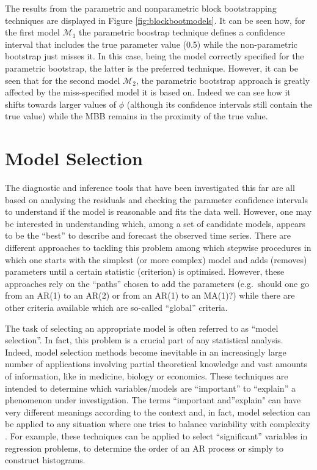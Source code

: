 \documentclass[]{book}
\theoremstyle{definition}
\theoremstyle{definition}
\theoremstyle{definition}
\theoremstyle{remark}
\begin{document}
The results from the parametric and nonparametric block bootstrapping
techniques are displayed in Figure \ref{fig:blockbootmodels}. It can be
seen how, for the first model \(\mathcal{M}_1\) the parametric boostrap
technique defines a confidence interval that includes the true parameter
value (0.5) while the non-parametric bootstrap just misses it. In this
case, being the model correctly specified for the parametric bootstrap,
the latter is the preferred technique. However, it can be seen that for
the second model \(\mathcal{M}_2\), the parametric bootstrap approach is
greatly affected by the miss-specified model it is based on. Indeed we
can see how it shifts towards larger values of \(\phi\) (although its
confidence intervals still contain the true value) while the MBB remains
in the proximity of the true value.

\section{Model Selection}\label{model-selection}

The diagnostic and inference tools that have been investigated this far
are all based on analysing the residuals and checking the parameter
confidence intervals to understand if the model is reasonable and fits
the data well. However, one may be interested in understanding which,
among a set of candidate models, appears to be the ``best'' to describe
and forecast the observed time series. There are different approaches to
tackling this problem among which stepwise procedures in which one
starts with the simplest (or more complex) model and adds (removes)
parameters until a certain statistic (criterion) is optimised. However,
these approaches rely on the ``paths'' chosen to add the parameters
(e.g.~should one go from an AR(1) to an AR(2) or from an AR(1) to an
MA(1)?) while there are other criteria available which are so-called
``global'' criteria.

The task of selecting an appropriate model is often referred to as
``model selection''. In fact, this problem is a crucial part of any
statistical analysis. Indeed, model selection methods become inevitable
in an increasingly large number of applications involving partial
theoretical knowledge and vast amounts of information, like in medicine,
biology or economics. These techniques are intended to determine which
variables/models are ``important'' to ``explain'' a phenomenon under
investigation. The terms ``important and''explain" can have very
different meanings according to the context and, in fact, model
selection can be applied to any situation where one tries to balance
variability with complexity \citep{mcquarrie1998regression}. For
example, these techniques can be applied to select ``significant''
variables in regression problems, to determine the order of an AR
process or simply to construct histograms.
\end{document}
